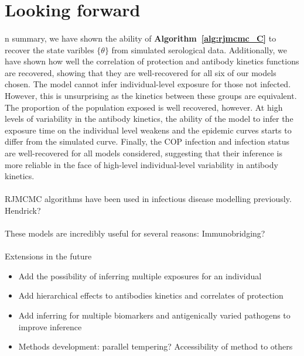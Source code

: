 \section{Looking forward}
\paragraph{}n summary, we have shown the ability of \textbf{Algorithm~\ref{alg:rjmcmc_C}} to recover the state varibles $\{\theta\}$ from simulated serological data. Additionally, we have shown how well the correlation of protection and antibody kinetics functions are recovered, showing that they are well-recovered for all six of our models chosen. The model cannot infer individual-level exposure for those not infected. However, this is unsurprising as the kinetics between these groups are equivalent. The proportion of the population exposed is well recovered, however. At high levels of variability in the antibody kinetics, the ability of the model to infer the exposure time on the individual level weakens and the epidemic curves starts to differ from the simulated curve. Finally, the COP infection and infection status are well-recovered for all models considered, suggesting that their inference is more reliable in the face of high-level individual-level variability in antibody kinetics. 

\paragraph{}RJMCMC algorithms have been used in infectious disease modelling previously. Hendrick? 

\paragraph{}These models are incredibly useful for several reasons: Immunobridging?

\paragraph{}Extensions in the future
\begin{itemize}
\item Add the possibility of inferring multiple exposures for an individual
\item Add hierarchical effects to antibodies kinetics and correlates of protection
\item Add inferring for multiple biomarkers and antigenically varied pathogens to improve inference
\item Methods development: parallel tempering? Accessibility of method to others 
\end{itemize}


